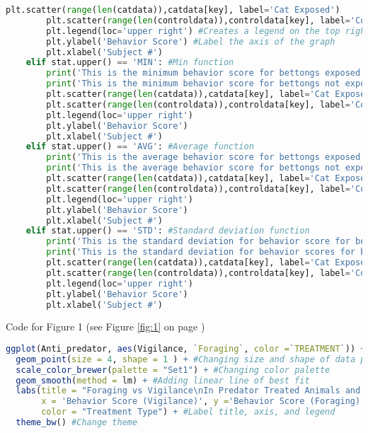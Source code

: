 \documentclass[letterpaper]{article}
\begin{document}
\begin{lstlisting}[language = Python]
        plt.scatter(range(len(catdata)),catdata[key], label='Cat Exposed')
        plt.scatter(range(len(controldata)),controldata[key], label='Control')
        plt.legend(loc='upper right') #Creates a legend on the top right with two labels, 'Cat Exposed' and 'Control'
        plt.ylabel('Behavior Score') #Label the axis of the graph 
        plt.xlabel('Subject #')
    elif stat.upper() == 'MIN': #Min function
        print('This is the minimum behavior score for bettongs exposed to cats:',round(catdata[key].min(), 3))
        print('This is the minimum behavior score for bettongs not exposed to cats:',round(controldata[key].min(), 3))
        plt.scatter(range(len(catdata)),catdata[key], label='Cat Exposed')
        plt.scatter(range(len(controldata)),controldata[key], label='Control')
        plt.legend(loc='upper right')
        plt.ylabel('Behavior Score')
        plt.xlabel('Subject #')
    elif stat.upper() == 'AVG': #Average function
        print('This is the average behavior score for bettongs exposed to cats:',round(catdata[key].mean(), 3))
        print('This is the average behavior score for bettongs not exposed to cats:',round(controldata[key].mean(), 3))
        plt.scatter(range(len(catdata)),catdata[key], label='Cat Exposed')
        plt.scatter(range(len(controldata)),controldata[key], label='Control')
        plt.legend(loc='upper right')
        plt.ylabel('Behavior Score')
        plt.xlabel('Subject #')
    elif stat.upper() == 'STD': #Standard deviation function
        print('This is the standard deviation for behavior score for bettongs exposed to cats:', round(catdata[key].std(), 3))
        print('This is the standard deviation for behavior scores for bettongs not exposed to cats:',round(controldata[key].std(), 3))
        plt.scatter(range(len(catdata)),catdata[key], label='Cat Exposed')
        plt.scatter(range(len(controldata)),controldata[key], label='Control')
        plt.legend(loc='upper right')
        plt.ylabel('Behavior Score')
        plt.xlabel('Subject #')
\end{lstlisting}

Code for Figure 1 (see Figure \ref{fig:1} on page \pageref{fig:1})
\begin{lstlisting}[language = R]
ggplot(Anti_predator, aes(Vigilance, `Foraging`, color =`TREATMENT`)) + #Using Anti_predator dataset, call for Vigilance as my x-values and Foraging for my y-values, also colors the points based on treatment type
  geom_point(size = 4, shape = 1 ) + #Changing size and shape of data point
  scale_color_brewer(palette = "Set1") + #Changing color palette
  geom_smooth(method = lm) + #Adding linear line of best fit
  labs(title = "Foraging vs Vigilance\nIn Predator Treated Animals and Non-predator Treated Animals",
       x = 'Behavior Score (Vigilance)', y ='Behavior Score (Foraging)',
       color = "Treatment Type") + #Label title, axis, and legend
  theme_bw() #Change theme
\end{lstlisting}
\end{document}
